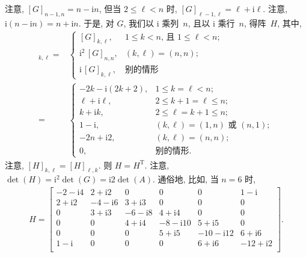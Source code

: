 \documentclass[../libro.tex]{subfiles}
\begin{document}
\begin{example}
    注意, \([G]_{n-1,n} = n - \mathrm{i} n\),
    但当 \(2 \leq \ell < n\) 时, \([G]_{\ell-1,\ell} = \ell + \mathrm{i} \ell\).
    注意, \(\mathrm{i} (n - \mathrm{i} n) = n + \mathrm{i} n\).
    于是, 对 \(G\), 我们以 \(\mathrm{i}\) 乘列~\(n\),
    且以 \(\mathrm{i}\) 乘行~\(n\),
    得阵~\(H\),
    其中,
    \begin{align*}
        [H]_{k,\ell}
        = {} &
        \begin{cases}
            [G]_{k,\ell},              & \text{\(1 \leq k < n\), 且 \(1 \leq \ell < n\)}; \\
            \mathrm{i}^2\, [G]_{n,n},  & (k, \ell) = (n, n);                             \\
            \mathrm{i}\, [G]_{k,\ell}, & \text{别的情形}
        \end{cases}
        \\
        = {} &
        \begin{cases}
            -2k - \mathrm{i} (2k+2), & 1 \leq k = \ell < n;                        \\
            \ell + \mathrm{i} \ell,  & 2 \leq k + 1 = \ell \leq n;                 \\
            k + \mathrm{i} k,        & 2 \leq \ell = k + 1 \leq n;                 \\
            1 - \mathrm{i},          & \text{\((k, \ell) = (1, n)\) 或 \((n, 1)\)}; \\
            -2n + \mathrm{i} 2,      & (k, \ell) = (n, n);                         \\
            0,                       & \text{别的情形}.
        \end{cases}
    \end{align*}
    注意, \([H]_{k,\ell} = [H]_{\ell,k}\).
    则 \(H = H^{\mathrm{T}}\).
    注意, \(\det {(H)} = \mathrm{i}^2 \det {(G)} = \mathrm{i} 2 \det {(A)}\).
    通俗地, 比如, 当 \(n = 6\) 时,
    \begin{align*}
        H =
        \begin{bmatrix}
            -2-\mathrm{i}4 & 2+\mathrm{i}2  & 0              & 0               & 0                & 1-\mathrm{i}    \\
            2+\mathrm{i}2  & -4-\mathrm{i}6 & 3+\mathrm{i}3  & 0               & 0                & 0               \\
            0              & 3+\mathrm{i}3  & -6-\mathrm{i}8 & 4+\mathrm{i}4   & 0                & 0               \\
            0              & 0              & 4+\mathrm{i}4  & -8-\mathrm{i}10 & 5+\mathrm{i}5    & 0               \\
            0              & 0              & 0              & 5+\mathrm{i}5   & -10-\mathrm{i}12 & 6+\mathrm{i}6   \\
            1-\mathrm{i}   & 0              & 0              & 0               & 6+\mathrm{i}6    & -12+\mathrm{i}2 \\
        \end{bmatrix}.
    \end{align*}


\end{example}
\end{document}
